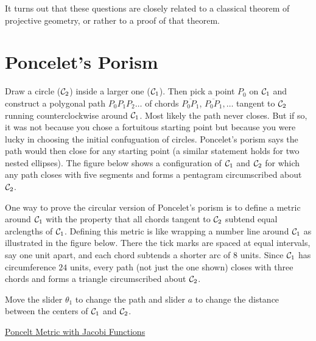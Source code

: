 \documentclass{ximera}
\begin{document}
It turns out that these questions are closely related to a classical theorem of projective geometry, or rather to a proof of that theorem.


\section*{Poncelet's Porism}



Draw a circle (${\cal C}_2$) inside a larger one (${\cal C}_1$). Then pick a point $P_0$ on ${\cal C}_1$ and construct a polygonal path $P_0 P_1 P_2 \ldots$ of chords $\overline{P_0P_1}$, $\overline{P_0P_1}, \ldots$ tangent to ${\cal C}_2$ running counterclockwise around ${\cal C}_1$. Most likely the path never closes.  But if so, it was not because you chose a fortuitous starting point but because you were lucky in choosing the initial confuguation of circles. Poncelet's porism says the path would then close for any starting point (a similar statement holds for two nested ellipses). The figure below shows a configuration of ${\cal C}_1$ and ${\cal C}_2$ for which any path closes with five segments and forms a pentagram circumscribed about ${\cal C}_2$.


One way to prove the circular version of Poncelet's porism is to define a metric around ${\cal C}_1$ with the property that all chords tangent to ${\cal C}_2$ subtend equal arclengths of ${\cal C}_1$. Defining this metric is like wrapping a number line around ${\cal C}_1$ as illustrated in the figure below. There the tick marks are spaced at equal intervals, say one unit apart, and each chord subtends a shorter arc of $8$ units. Since ${\cal C}_1$ has circumference $24$ units, every path (not just the one shown) closes with three chords and forms a triangle circumscribed about ${\cal C}_2$.  

\begin{exploration}
Move the slider $\theta_1$ to change the path and slider $a$ to change the distance between the centers of ${\cal C}_1$ and ${\cal C}_2$.
 
\begin{onlineOnly}
    \begin{center}
\end{center}
\end{onlineOnly}

\href{https://www.desmos.com/calculator/wzctareiln}{Poncelt Metric with Jacobi Functions}

\end{exploration}
\end{document}
